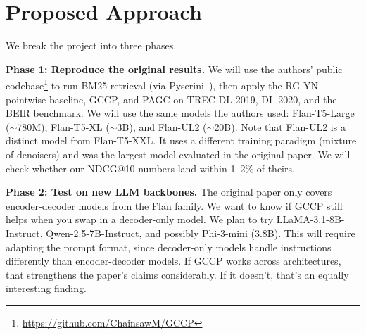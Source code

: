 \documentclass[conference]{IEEEtran}
\begin{document}
\section{Proposed Approach}

We break the project into three phases.

\textbf{Phase 1: Reproduce the original results.}
We will use the authors' public codebase\footnote{\url{https://github.com/ChainsawM/GCCP}} to run BM25 retrieval (via Pyserini~\cite{lin2021pyserini}), then apply the RG-YN pointwise baseline, GCCP, and PAGC on TREC DL 2019, DL 2020, and the BEIR benchmark. We will use the same models the authors used: Flan-T5-Large ($\sim$780M), Flan-T5-XL ($\sim$3B), and Flan-UL2 ($\sim$20B). Note that Flan-UL2 is a distinct model from Flan-T5-XXL. It uses a different training paradigm (mixture of denoisers) and was the largest model evaluated in the original paper. We will check whether our NDCG@10 numbers land within 1--2\% of theirs.

\textbf{Phase 2: Test on new LLM backbones.}
The original paper only covers encoder-decoder models from the Flan family. We want to know if GCCP still helps when you swap in a decoder-only model. We plan to try LLaMA-3.1-8B-Instruct, Qwen-2.5-7B-Instruct, and possibly Phi-3-mini (3.8B). This will require adapting the prompt format, since decoder-only models handle instructions differently than encoder-decoder models. If GCCP works across architectures, that strengthens the paper's claims considerably. If it doesn't, that's an equally interesting finding.
\end{document}
